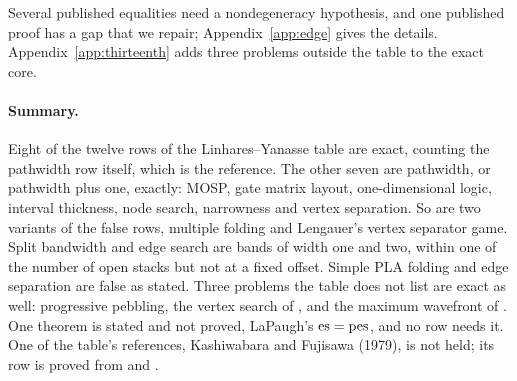 Several published equalities need a nondegeneracy hypothesis, and one published
proof has a gap that we repair; Appendix~\ref{app:edge} gives the details.
Appendix~\ref{app:thirteenth} adds three problems outside the table to the
exact core.

\paragraph{Summary.} Eight of the twelve rows of the Linhares--Yanasse table
are exact, counting the pathwidth row itself, which is the reference. The other
seven are pathwidth, or pathwidth plus one, exactly: MOSP, gate matrix layout,
one-dimensional logic, interval thickness, node search, narrowness and vertex
separation. So are two variants of the false rows, multiple folding and
Lengauer's vertex separator game. Split bandwidth and edge search are bands of
width one and two, within one of the number of open stacks but not at a fixed
offset. Simple PLA folding and edge separation are false as stated. Three
problems the table does not list are exact as well: progressive pebbling, the
vertex search of \citet{BRST1991}, and the maximum wavefront of
\citet{KumfertPothen1997}. One theorem is stated and not proved, LaPaugh's
$\mathrm{es}=\mathrm{pes}$, and no row needs it.
One of the table's references, Kashiwabara and Fujisawa (1979), is not held; its
row is proved from \citet{LY2002ref6} and \citet{LY2002ref9}.
